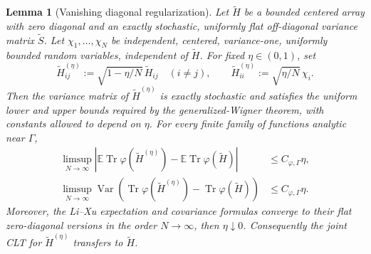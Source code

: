 \documentclass[11pt]{article}
\newtheorem{lemma}[theorem]{Lemma}
\theoremstyle{definition}
\theoremstyle{remark}
\newcommand{\E}{\mathbb E}
\newcommand{\Var}{\operatorname{Var}}
\newcommand{\Tr}{\operatorname{Tr}}
\begin{document}
\begin{lemma}[Vanishing diagonal regularization]
\label{lem:R3-diagonal-regularization}
Let \(\widetilde H\) be a bounded centered array with zero diagonal and an
exactly stochastic, uniformly flat off-diagonal variance matrix
\(\widetilde S\).  Let \(\chi_1,\ldots,\chi_N\) be independent, centered,
variance-one, uniformly bounded random variables, independent of
\(\widetilde H\).  For fixed \(\eta\in(0,1)\), set
\begin{equation}\label{eq:R3-eta-matrix}
 \widetilde H^{(\eta)}_{ij}
 :=\sqrt{1-\eta/N}\,\widetilde H_{ij}\quad(i\ne j),
 \qquad
 \widetilde H^{(\eta)}_{ii}:=\sqrt{\eta/N}\,\chi_i.
\end{equation}
Then the variance matrix of \(\widetilde H^{(\eta)}\) is exactly stochastic
and satisfies the uniform lower and upper bounds required by the
generalized-Wigner theorem, with constants allowed to depend on \(\eta\).
For every finite family of functions analytic near \(\Gamma\),
\begin{align}
 \limsup_{N\to\infty}\left|
 \E\Tr\varphi(\widetilde H^{(\eta)})
 -\E\Tr\varphi(\widetilde H)
 \right|&\le C_{\varphi,\Gamma}\eta,
 \label{eq:R3-eta-mean}\\
 \limsup_{N\to\infty}\Var\!\left(
 \Tr\varphi(\widetilde H^{(\eta)})
 -\Tr\varphi(\widetilde H)
 \right)&\le C_{\varphi,\Gamma}\eta.
 \label{eq:R3-eta-L2}
\end{align}
Moreover, the Li--Xu expectation and covariance formulas converge to their flat
zero-diagonal versions in the order \(N\to\infty\), then
\(\eta\downarrow0\).  Consequently the joint CLT for
\(\widetilde H^{(\eta)}\) transfers to \(\widetilde H\).
\end{lemma}
\end{document}
